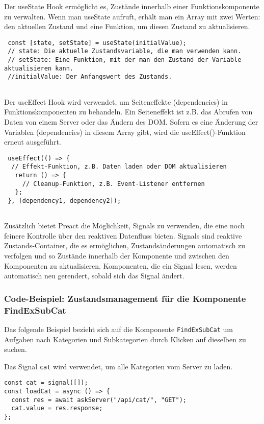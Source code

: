  Der useState Hook ermöglicht es, Zustände innerhalb einer Funktionskomponente zu verwalten. Wenn man useState aufruft, erhält man ein Array mit zwei Werten: den aktuellen Zustand und eine Funktion, um diesen Zustand zu aktualisieren.
 
 \begin{lstlisting}
 const [state, setState] = useState(initialValue);
 // state: Die aktuelle Zustandsvariable, die man verwenden kann.
 // setState: Eine Funktion, mit der man den Zustand der Variable aktualisieren kann.
 //initialValue: Der Anfangswert des Zustands.
 
 \end{lstlisting}
 
 
 Der useEffect Hook wird verwendet, um Seiteneffekte (dependencies) in Funktionskomponenten zu behandeln. Ein Seiteneffekt ist z.B. das Abrufen von Daten von einem Server oder das Ändern des DOM. Sofern es eine Änderung der Variablen (dependencies) in diesem Array gibt, wird die useEffect()-Funktion erneut ausgeführt.
 
 \begin{lstlisting}
 useEffect(() => {
  // Effekt-Funktion, z.B. Daten laden oder DOM aktualisieren
   return () => {
     // Cleanup-Funktion, z.B. Event-Listener entfernen
   };
 }, [dependency1, dependency2]);
 
 \end{lstlisting}
   
 
 
Zusätzlich bietet Preact die Möglichkeit, Signals zu verwenden, die eine noch feinere Kontrolle über den reaktiven Datenfluss bieten.
Signals sind reaktive Zustands-Container, die es ermöglichen, Zustandsänderungen automatisch zu verfolgen und so Zustände innerhalb der Komponente und zwischen den Komponenten zu aktualisieren. Komponenten, die ein Signal lesen, werden automatisch neu gerendert, sobald sich das Signal ändert.
 

\subsubsection{Code-Beispiel: Zustandsmanagement für die Komponente FindExSubCat } 
Das folgende Beispiel bezieht sich auf die Komponente \texttt{FindExSubCat} um Aufgaben nach Kategorien und Subkategorien durch Klicken auf dieselben zu suchen.

Das Signal \texttt{cat} wird verwendet, um alle Kategorien vom Server zu laden.

\begin{lstlisting}
const cat = signal([]);
const loadCat = async () => {
  const res = await askServer("/api/cat/", "GET");
  cat.value = res.response;
};

\end{lstlisting}

